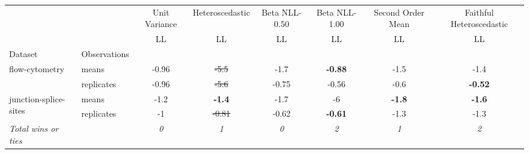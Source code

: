 \begin{tabular}{ll|c|c|c|c|c|c}
\toprule
{} & {} & {Unit Variance} & {Heteroscedastic} & {Beta NLL-0.50} & {Beta NLL-1.00} & {Second Order Mean} & {Faithful Heteroscedastic} \\
{} & {} & {LL} & {LL} & {LL} & {LL} & {LL} & {LL} \\
{Dataset} & {Observations} & {} & {} & {} & {} & {} & {} \\
\midrule
\multirow[c]{2}{*}{flow-cytometry} & means & -0.96 & \sout{-5.5} & -1.7 & \textbf{-0.88} & -1.5 & -1.4 \\
 & replicates & -0.96 & \sout{-5.6} & -0.75 & -0.56 & -0.6 & \textbf{-0.52} \\
\multirow[c]{2}{*}{junction-splice-sites} & means & -1.2 & \textbf{-1.4} & -1.7 & -6 & \textbf{-1.8} & \textbf{-1.6} \\
 & replicates & -1 & \sout{-0.81} & -0.62 & \textbf{-0.61} & -1.3 & -1.3 \\
\textit{{Total wins or ties}} &  & \textit{0} & \textit{1} & \textit{0} & \textit{2} & \textit{1} & \textit{2} \\
\bottomrule
\end{tabular}
